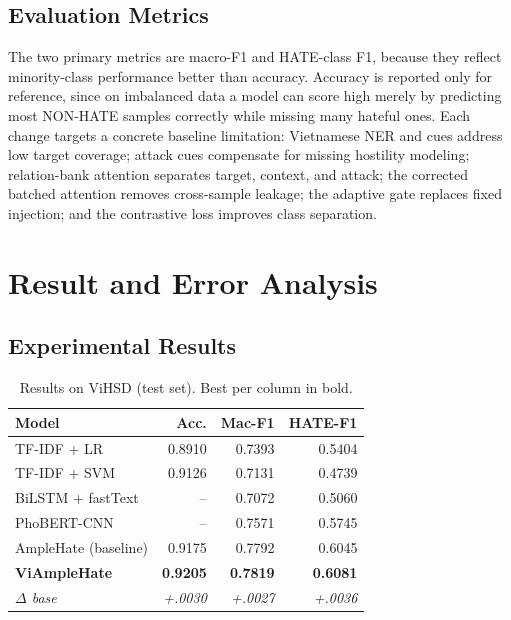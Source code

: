 \documentclass[11pt]{article}
\begin{document}
\subsection{Evaluation Metrics}
The two primary metrics are macro-F1 and HATE-class F1, because they reflect minority-class performance better than accuracy. Accuracy is reported only for reference, since on imbalanced data a model can score high merely by predicting most NON-HATE samples correctly while missing many hateful ones. Each change targets a concrete baseline limitation: Vietnamese NER and cues address low target coverage; attack cues compensate for missing hostility modeling; relation-bank attention separates target, context, and attack; the corrected batched attention removes cross-sample leakage; the adaptive gate replaces fixed injection; and the contrastive loss improves class separation.

\section{Result and Error Analysis}

\subsection{Experimental Results}

\begin{table}[t]
  \centering
  \small
  \begin{tabular}{lrrr}
    \toprule
    \textbf{Model} & \textbf{Acc.} & \textbf{Mac-F1} & \textbf{HATE-F1} \\
    \midrule
    TF-IDF + LR              & 0.8910 & 0.7393 & 0.5404 \\
    TF-IDF + SVM             & 0.9126 & 0.7131 & 0.4739 \\
    BiLSTM + fastText        & --     & 0.7072 & 0.5060 \\
    PhoBERT-CNN              & --     & 0.7571 & 0.5745 \\
    AmpleHate (baseline)     & 0.9175 & 0.7792 & 0.6045 \\
    \textbf{ViAmpleHate}     & \textbf{0.9205} & \textbf{0.7819} & \textbf{0.6081} \\
    \textit{$\Delta$ base}   & \textit{+.0030} & \textit{+.0027} & \textit{+.0036} \\
    \bottomrule
  \end{tabular}
  \caption{Results on ViHSD (test set). Best per column in bold.}
  \label{tab:vihsd}
\end{table}
\end{document}
